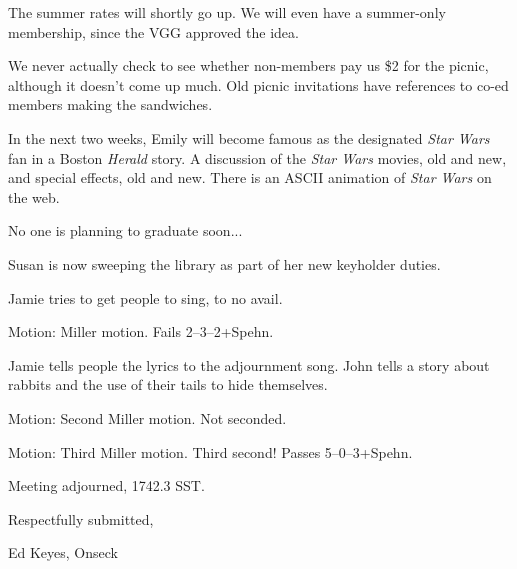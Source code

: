 \documentclass[12pt]{article}
\begin{document}
The summer rates will shortly go up.  We will even have a summer-only
membership, since the VGG approved the idea.

We never actually check to see whether non-members pay us \$2 for the
picnic, although it doesn't come up much.  Old picnic invitations have
references to co-ed members making the sandwiches.

In the next two weeks, Emily will become famous as the designated
{\em Star Wars} fan in a Boston {\em Herald} story.  A discussion of
the {\em Star Wars} movies, old and new, and special effects, old and
new.  There is an ASCII animation of {\em Star Wars} on the web.

No one is planning to graduate soon...

Susan is now sweeping the library as part of her new keyholder duties.

Jamie tries to get people to sing, to no avail.

Motion: Miller motion.  Fails 2--3--2+Spehn.

Jamie tells people the lyrics to the adjournment song.  John tells a
story about rabbits and the use of their tails to hide themselves.

Motion: Second Miller motion.  Not seconded.

Motion: Third Miller motion.  Third second!  Passes 5--0--3+Spehn.

\vspace{12pt}

\noindent
Meeting adjourned, 1742.3 SST.

\vspace{18pt}

\centerline{Respectfully submitted,}
\centerline{Ed Keyes, Onseck}
\end{document}
